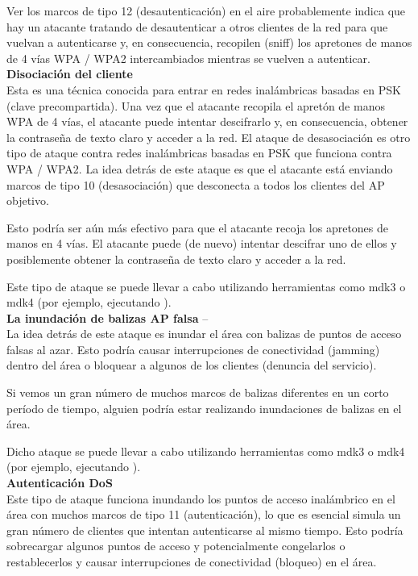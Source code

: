 Ver los marcos de tipo 12 (desautenticación) en el aire probablemente indica que hay un atacante tratando de desautenticar a otros clientes de la red para que vuelvan a autenticarse y, en consecuencia, recopilen (sniff) los apretones de manos de 4 vías WPA / WPA2 intercambiados mientras se vuelven a autenticar.\\



\textbf{Disociación del cliente}		\\


Esta es una técnica conocida para entrar en redes inalámbricas basadas en PSK (clave precompartida). Una vez que el atacante recopila el apretón de manos WPA de 4 vías, el atacante puede intentar descifrarlo y, en consecuencia, obtener la contraseña de texto claro y acceder a la red.
El ataque de desasociación es otro tipo de ataque contra redes inalámbricas basadas en PSK que funciona contra WPA / WPA2. La idea detrás de este ataque es que el atacante está enviando marcos de tipo 10 (desasociación) que desconecta a todos los clientes del AP objetivo.

Esto podría ser aún más efectivo para que el atacante recoja los apretones de manos en 4 vías. El atacante puede (de nuevo) intentar descifrar uno de ellos y posiblemente obtener la contraseña de texto claro y acceder a la red.

Este tipo de ataque se puede llevar a cabo utilizando herramientas como mdk3 o mdk4 (por ejemplo, ejecutando ).\\


\textbf{La inundación de balizas AP falsa}		--\\
La idea detrás de este ataque es inundar el área con balizas de puntos de acceso falsas al azar. Esto podría causar interrupciones de conectividad (jamming) dentro del área o bloquear a algunos de los clientes (denuncia del servicio).

Si vemos un gran número de muchos marcos de balizas diferentes en un corto período de tiempo, alguien podría estar realizando inundaciones de balizas en el área.

Dicho ataque se puede llevar a cabo utilizando herramientas como mdk3 o mdk4 (por ejemplo, ejecutando ).\\


\textbf{Autenticación DoS}		\\
Este tipo de ataque funciona inundando los puntos de acceso inalámbrico en el área con muchos marcos de tipo 11 (autenticación), lo que es esencial simula un gran número de clientes que intentan autenticarse al mismo tiempo. Esto podría sobrecargar algunos puntos de acceso y potencialmente congelarlos o restablecerlos y causar interrupciones de conectividad (bloqueo) en el área.

